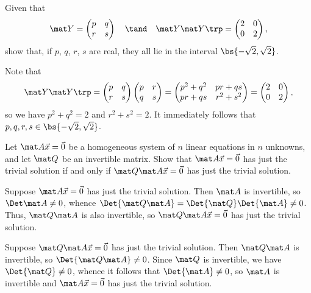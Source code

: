 \begin{problem}
    Given that \[\mat Y = \begin{pmatrix}p & q \\ r & s\end{pmatrix} \quad \tand \quad \mat Y \mat Y \trp = \begin{pmatrix}2 & 0 \\ 0 & 2 \end{pmatrix},\] show that, if $p$, $q$, $r$, $s$ are real, they all lie in the interval $\bs{-\sqrt2, \sqrt2}$.
\end{problem}
\begin{solution}
    Note that \[\mat Y \mat Y \trp = \begin{pmatrix}p & q \\ r & s\end{pmatrix} \begin{pmatrix}p & r \\ q & s\end{pmatrix} = \begin{pmatrix}p^2 + q^2 & pr + qs \\ pr + qs & r^2 + s^2\end{pmatrix} = \begin{pmatrix}2 & 0 \\ 0 & 2 \end{pmatrix},\] so we have $p^2 + q^2 = 2$ and $r^2 + s^2 = 2$. It immediately follows that $p, q, r, s \in \bs{-\sqrt2, \sqrt2}$.
\end{solution}

\begin{problem}
    Let $\mat A \vec x = \vec 0$ be a homogeneous system of $n$ linear equations in $n$ unknowns, and let $\mat Q$ be an invertible matrix. Show that $\mat A \vec x = \vec 0$ has just the trivial solution if and only if $\mat Q \mat A \vec x = \vec 0$ has just the trivial solution.
\end{problem}
\begin{solution}
    Suppose $\mat A \vec x = \vec 0$ has just the trivial solution. Then $\mat A$ is invertible, so $\Det \mat A \neq 0$, whence $\Det{\mat Q \mat A} = \Det{\mat Q} \Det{\mat A} \neq 0$. Thus, $\mat Q \mat A$ is also invertible, so $\mat Q \mat A \vec x = \vec 0$ has just the trivial solution.

    Suppose $\mat Q \mat A \vec x = \vec 0$ has just the trivial solution. Then $\mat Q \mat A$ is invertible, so $\Det{\mat Q \mat A} \neq 0$. Since $\mat Q$ is invertible, we have $\Det{\mat Q} \neq 0$, whence it follows that $\Det{\mat A} \neq 0$, so $\mat A$ is invertible and $\mat A \vec x = \vec 0$ has just the trivial solution.
\end{solution}

